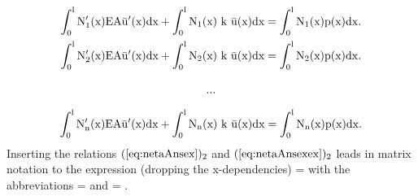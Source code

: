 \begin{equation}
\renewcommand{\arraystretch}{2.5}
\begin{array}{c}
\displaystyle\rm
\int_0^l N_1^{\prime}(x) EA \bar{u}^{\prime}(x) dx 
+
\int_0^l N_1(x) ~ k ~\bar{u}(x) dx 
= \int_0^l N_1(x) p(x) dx.
\\
\displaystyle\rm
\int_0^l N_2^{\prime}(x) EA \bar{u}^{\prime}(x) dx 
+
\int_0^l N_2(x) ~ k ~\bar{u}(x) dx 
= \int_0^l N_2(x) p(x) dx.
\\
\displaystyle\rm  ... 
\\
\displaystyle\rm
\int_0^l N_n^{\prime}(x) EA \bar{u}^{\prime}(x) dx 
+
\int_0^l N_n(x) ~ k ~\bar{u}(x) dx 
= \int_0^l N_n(x) p(x) dx.
\end{array}
\label{eq:nResLoesunggal1}
\end{equation}
Inserting the relations 
$(\ref{eq:netaAnsex})_2$ and  $(\ref{eq:netaAnsexex})_2$ leads 
in matrix notation to the expression (dropping the x-dependencies)
\ebn
\renewcommand{\arraystretch}{2.0}
 =
\een
with the abbreviations
\eb
\rm
{} = 
\quad\mbox{\rm and}\quad
{}= .
\ee








